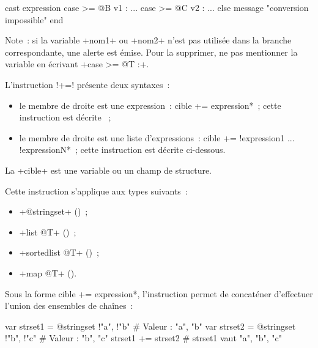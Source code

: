 \begin{galgasbox}
cast expression
case >= @B v1 :
  ...
case >= @C v2 :
  ...
else
  message "conversion impossible"
end
\end{galgasbox}

Note~: si la variable \ggs+nom1+ ou  \ggs+nom2+ n'est pas utilisée dans la branche correspondante, une alerte est émise. Pour la supprimer, ne pas mentionner la variable en écrivant \ggs+case >= @T :+.










L'instruction \ggs!+=! présente deux syntaxes~:
\begin{itemize}
  \item le membre de droite est une expression~: \ggs*cible += expression*~; cette instruction est décrite ~;
  \item le membre de droite est une liste d'expressions~: \ggs*cible += !expression1 ... !expressionN*~; cette instruction est décrite ci-dessous.
\end{itemize}

La \ggs+cible+ est une variable ou un champ de structure.

Cette instruction s'applique aux types suivants~:
\begin{itemize}
  \item \ggs+@stringset+ ()~;
  \item \ggs+list @T+ ()~;
  \item \ggs+sortedlist @T+ ()~;
  \item \ggs+map @T+ ().
\end{itemize}



Sous la forme \ggs*cible += expression*, l'instruction permet de concaténer d'effectuer l'union des ensembles de chaînes~:
\begin{galgas}
var strset1 = @stringset {!"a", !"b"} # Valeur : "a", "b"
var strset2 = @stringset {!"b", !"c"} # Valeur : "b", "c"
strset1 += strset2 # strset1 vaut "a", "b", "c"
\end{galgas}

